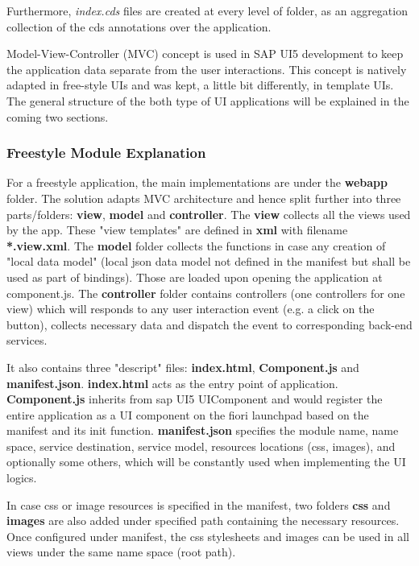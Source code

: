 Furthermore, \textit{index.cds} files are created at every level of folder, as an aggregation collection of the cds annotations over the application.

Model-View-Controller (MVC) concept is used in SAP UI5 development to keep the application data separate from the user interactions. This concept is natively adapted in free-style UIs and was kept, a little bit differently, in template UIs. The general structure of the both type of UI applications will be explained in the coming two sections. 

\subsubsection{Freestyle Module Explanation}
For a freestyle application, the main implementations are under the \textbf{webapp} folder. The solution adapts MVC architecture and hence split further into three parts/folders: \textbf{view}, \textbf{model} and \textbf{controller}. The \textbf{view} collects all the views used by the app. These "view templates" are defined in \textbf{xml} with filename \textbf{*.view.xml}. The \textbf{model} folder collects the functions in case any creation of "local data model" (local json data model not defined in the manifest but shall be used as part of bindings). Those are loaded upon opening the application at component.js. The \textbf{controller} folder contains controllers (one controllers for one view) which will responds to any user interaction event (e.g. a click on the button), collects necessary data and dispatch the event to corresponding back-end services.

It also contains three "descript" files: \textbf{index.html}, \textbf{Component.js} and \textbf{manifest.json}. \textbf{index.html} acts as the entry point of application.  \textbf{Component.js} inherits from sap UI5 UIComponent and would register the entire application as a UI component on the fiori launchpad based on the manifest and its init function. \textbf{manifest.json} specifies the module name, name space, service destination, service model, resources locations (css, images), and optionally some others, which will be constantly used when implementing the UI logics.

In case css or image resources is specified in the manifest, two folders \textbf{css} and \textbf{images} are also added under specified path containing the necessary resources. Once configured under manifest, the css stylesheets and images can be used in all views under the same name space (root path).

